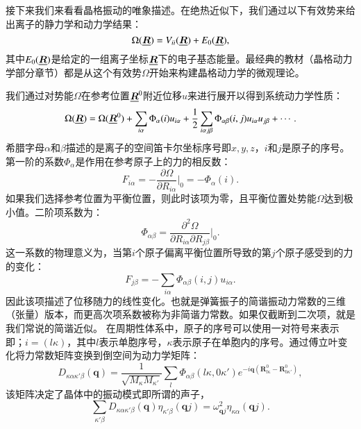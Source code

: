 接下来我们来看看晶格振动的唯象描述。在绝热近似下，我们通过以下有效势来给出离子的静力学和动力学结果：
\begin{equation}\label{eq:effective_potential}
  \Omega(\underline{\bm{R}}) = V_{ii}(\underline{\bm{R}}) + E_0(\underline{\bm{R}}),
\end{equation}
其中$E_0(\underline{\bm{R}})$是给定的一组离子坐标$\underline{\bm{R}}$下的电子基态能量。最经典的教材\cite{born1954dynamical,bottger1983principles}（晶格动力学部分章节）都是从这个有效势$\Omega$开始来构建晶格动力学的微观理论。

我们通过对势能$\Omega$在参考位置$\underline{\bm{R}}^0$附近位移$u$来进行展开以得到系统动力学性质：
\begin{equation}
  \Omega(\underline{\bm{R}}) = \Omega(\underline{\bm{R}}^0) + \sum_{i\alpha} \Phi_\alpha(i)u_{i\alpha} + \frac{1}{2} \sum_{i\alpha j\beta} \Phi_{\alpha\beta}(i,j) u_{i\alpha}u_{j\beta} + \cdots .
\end{equation}
希腊字母$\alpha$和$\beta$描述的是离子的空间笛卡尔坐标序号即$x,y,z$，$i$和$j$是原子的序号。第一阶的系数$\Phi_\alpha$是作用在参考原子上的力的相反数：
\begin{equation}
  F_{i\alpha} = -\frac{\partial\Omega}{\partial R_{i\alpha}}\bigg|_0 = -\Phi_\alpha(i).
\end{equation}
如果我们选择参考位置为平衡位置，则此时该项为零，且平衡位置处势能$\Omega$达到极小值。二阶项系数为：
\begin{equation}\label{eq:omega_second_order}
  \Phi_{\alpha\beta} = \frac{\partial^2\Omega}{\partial R_{i\alpha}\partial R_{j\beta}} \bigg|_0 .
\end{equation}
这一系数的物理意义为，当第$i$个原子偏离平衡位置所导致的第$j$个原子感受到的力的变化：
\begin{equation}
  F_{j\beta} = -\sum_{i\alpha} \Phi_{\alpha\beta}(i,j)u_{i\alpha}.
\end{equation}
因此该项描述了位移随力的线性变化。也就是弹簧振子的简谐振动力常数的三维（张量）版本，而更高次项系数被称为非简谐力常数。如果仅截断到二次项，就是我们常说的简谐近似。
在周期性体系中，原子的序号可以使用一对符号来表示即；$i=(l\kappa)$，其中$l$表示单胞序号，$\kappa$表示原子在单胞内的序号。通过傅立叶变化将力常数矩阵变换到倒空间为动力学矩阵：
\begin{equation}
  D_{\kappa\alpha\kappa'\beta}(\bm{q}) = \frac{1}{\sqrt{M_\kappa M_{\kappa'}}} \sum_l \Phi_{\alpha\beta}(l\kappa,0\kappa')e^{-i\bm{q}(\bm{R}^0_{l\kappa}-\bm{R}^0_{0\kappa'})},
\end{equation}
该矩阵决定了晶体中的振动模式即所谓的声子，
\begin{equation}
  \sum_{\kappa'\beta}D_{\kappa\alpha\kappa'\beta}(\bm{q})\eta_{\kappa'\beta}(\bm{q}j) = \omega^2_{\bm{q}j}\eta_{\kappa\alpha}(\bm{q}j).
\end{equation}
